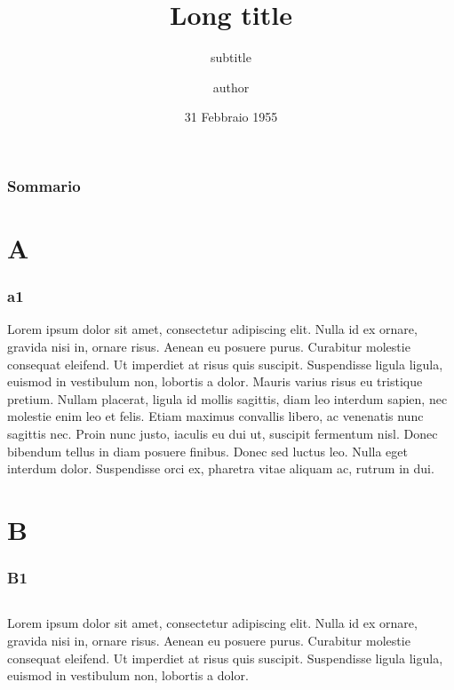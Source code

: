 \documentclass[c]{beamer}
\title[Short title]{Long title}
\subtitle{subtitle}
\author[author]{author}
\date[31/04/1995]{31 Febbraio 1955}
\begin{document}

\polimititlepage[polimi]
\addtocounter{framenumber}{-1}


\begin{frame}
\frametitle{Sommario}
\tableofcontents
\end{frame}

\section{A}
\begin{frame}
\frametitle{a1}

Lorem ipsum dolor sit amet, consectetur adipiscing elit. Nulla id ex ornare, gravida nisi in, ornare risus. Aenean eu posuere purus. Curabitur molestie consequat eleifend. Ut imperdiet at risus quis suscipit. Suspendisse ligula ligula, euismod in vestibulum non, lobortis a dolor. Mauris varius risus eu tristique pretium. Nullam placerat, ligula id mollis sagittis, diam leo interdum sapien, nec molestie enim leo et felis. Etiam maximus convallis libero, ac venenatis nunc sagittis nec. Proin nunc justo, iaculis eu dui ut, suscipit fermentum nisl. Donec bibendum tellus in diam posuere finibus. Donec sed luctus leo. Nulla eget interdum dolor. Suspendisse orci ex, pharetra vitae aliquam ac, rutrum in dui.

\end{frame}

\section{B}
\begin{frame}
\frametitle{B1}


\begin{columns}[c]
Lorem ipsum dolor sit amet, consectetur adipiscing elit. Nulla id ex ornare, gravida nisi in, ornare risus. Aenean eu posuere purus. Curabitur molestie consequat eleifend. Ut imperdiet at risus quis suscipit. Suspendisse ligula ligula, euismod in vestibulum non, lobortis a dolor. 

\end{columns}

\end{frame}
\end{document}
